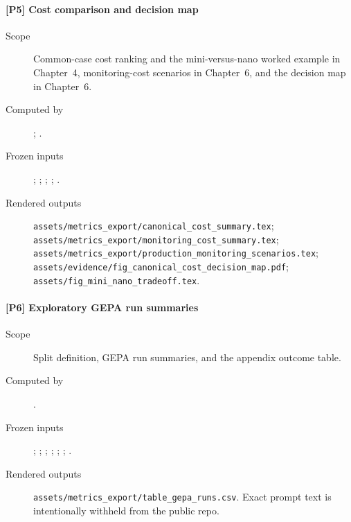 \label{prov:P5}
\paragraph*{[P5] Cost comparison and decision map}
\begin{description}
    \item[Scope] Common-case cost ranking and the mini-versus-nano worked example in Chapter~4, monitoring-cost scenarios in Chapter~6, and the decision map in Chapter~6.
    \item[Computed by] ; .
    \item[Frozen inputs] ; ; ; ; .
    \item[Rendered outputs] \texttt{assets/metrics\_export/canonical\_cost\_summary.tex}; \texttt{assets/metrics\_export/monitoring\_cost\_summary.tex}; \texttt{assets/metrics\_export/production\_monitoring\_scenarios.tex}; \texttt{assets/evidence/fig\_canonical\_cost\_decision\_map.pdf}; \texttt{assets/fig\_mini\_nano\_tradeoff.tex}.
\end{description}

\label{prov:P6}
\paragraph*{[P6] Exploratory GEPA run summaries}
\begin{description}
    \item[Scope] Split definition, GEPA run summaries, and the appendix outcome table.
    \item[Computed by] .
    \item[Frozen inputs] ; ; ; ; ; ; .
    \item[Rendered outputs] \texttt{assets/metrics\_export/table\_gepa\_runs.csv}. Exact prompt text is intentionally withheld from the public repo.
\end{description}

